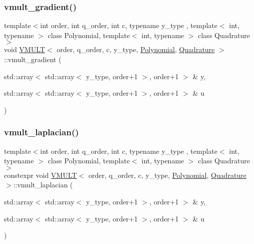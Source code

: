 \subsubsection{\texorpdfstring{vmult\+\_\+gradient()}{vmult\_gradient()}}
{\footnotesize\ttfamily template$<$int order, int q\+\_\+order, int c, typename y\+\_\+type , template$<$ int, typename $>$ class Polynomial, template$<$ int, typename $>$ class Quadrature$>$ \\
void \hyperlink{class_v_m_u_l_t}{V\+M\+U\+LT}$<$ order, q\+\_\+order, c, y\+\_\+type, \hyperlink{class_polynomial}{Polynomial}, \hyperlink{class_quadrature}{Quadrature} $>$\+::vmult\+\_\+gradient (\begin{DoxyParamCaption}\item[{std\+::array$<$ std\+::array$<$ y\+\_\+type, order+1 $>$, order+1 $>$ \&}]{y,  }\item[{std\+::array$<$ std\+::array$<$ y\+\_\+type, order+1 $>$, order+1 $>$ \&}]{u }\end{DoxyParamCaption})\hspace{0.3cm}{\ttfamily [inline]}}

\mbox{\label{class_v_m_u_l_t_a51c70b05d1f6d934470b1f11526cbc80}} 
\subsubsection{\texorpdfstring{vmult\+\_\+laplacian()}{vmult\_laplacian()}}
{\footnotesize\ttfamily template$<$int order, int q\+\_\+order, int c, typename y\+\_\+type , template$<$ int, typename $>$ class Polynomial, template$<$ int, typename $>$ class Quadrature$>$ \\
constexpr void \hyperlink{class_v_m_u_l_t}{V\+M\+U\+LT}$<$ order, q\+\_\+order, c, y\+\_\+type, \hyperlink{class_polynomial}{Polynomial}, \hyperlink{class_quadrature}{Quadrature} $>$\+::vmult\+\_\+laplacian (\begin{DoxyParamCaption}\item[{std\+::array$<$ std\+::array$<$ y\+\_\+type, order+1 $>$, order+1 $>$ \&}]{y,  }\item[{std\+::array$<$ std\+::array$<$ y\+\_\+type, order+1 $>$, order+1 $>$ \&}]{u }\end{DoxyParamCaption})\hspace{0.3cm}{\ttfamily [inline]}}


